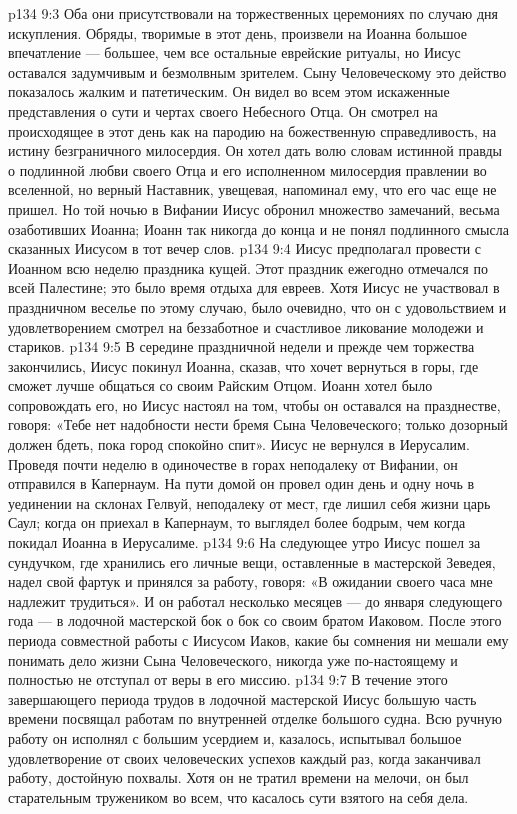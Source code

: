 \vs p134 9:3 Оба они присутствовали на торжественных церемониях по случаю дня искупления. Обряды, творимые в этот день, произвели на Иоанна большое впечатление --- большее, чем все остальные еврейские ритуалы, но Иисус оставался задумчивым и безмолвным зрителем. Сыну Человеческому это действо показалось жалким и патетическим. Он видел во всем этом искаженные представления о сути и чертах своего Небесного Отца. Он смотрел на происходящее в этот день как на пародию на божественную справедливость, на истину безграничного милосердия. Он хотел дать волю словам истинной правды о подлинной любви своего Отца и его исполненном милосердия правлении во вселенной, но верный Наставник, увещевая, напоминал ему, что его час еще не пришел. Но той ночью в Вифании Иисус обронил множество замечаний, весьма озаботивших Иоанна; Иоанн так никогда до конца и не понял подлинного смысла сказанных Иисусом в тот вечер слов.
\vs p134 9:4 Иисус предполагал провести с Иоанном всю неделю праздника кущей. Этот праздник ежегодно отмечался по всей Палестине; это было время отдыха для евреев. Хотя Иисус не участвовал в праздничном веселье по этому случаю, было очевидно, что он с удовольствием и удовлетворением смотрел на беззаботное и счастливое ликование молодежи и стариков.
\vs p134 9:5 В середине праздничной недели и прежде чем торжества закончились, Иисус покинул Иоанна, сказав, что хочет вернуться в горы, где сможет лучше общаться со своим Райским Отцом. Иоанн хотел было сопровождать его, но Иисус настоял на том, чтобы он оставался на празднестве, говоря: «Тебе нет надобности нести бремя Сына Человеческого; только дозорный должен бдеть, пока город спокойно спит». Иисус не вернулся в Иерусалим. Проведя почти неделю в одиночестве в горах неподалеку от Вифании, он отправился в Капернаум. На пути домой он провел один день и одну ночь в уединении на склонах Гелвуй, неподалеку от мест, где лишил себя жизни царь Саул; когда он приехал в Капернаум, то выглядел более бодрым, чем когда покидал Иоанна в Иерусалиме.
\vs p134 9:6 На следующее утро Иисус пошел за сундучком, где хранились его личные вещи, оставленные в мастерской Зеведея, надел свой фартук и принялся за работу, говоря: «В ожидании своего часа мне надлежит трудиться». И он работал несколько месяцев --- до января следующего года --- в лодочной мастерской бок о бок со своим братом Иаковом. После этого периода совместной работы с Иисусом Иаков, какие бы сомнения ни мешали ему понимать дело жизни Сына Человеческого, никогда уже по\hyp{}настоящему и полностью не отступал от веры в его миссию.
\vs p134 9:7 В течение этого завершающего периода трудов в лодочной мастерской Иисус большую часть времени посвящал работам по внутренней отделке большого судна. Всю ручную работу он исполнял с большим усердием и, казалось, испытывал большое удовлетворение от своих человеческих успехов каждый раз, когда заканчивал работу, достойную похвалы. Хотя он не тратил времени на мелочи, он был старательным тружеником во всем, что касалось сути взятого на себя дела.

